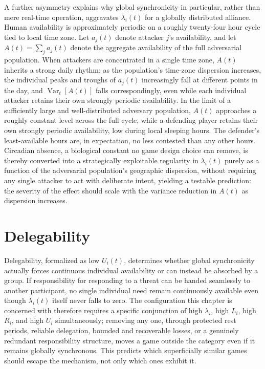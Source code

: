 A further asymmetry explains why global synchronicity in particular, rather than mere real-time operation, aggravates $\lambda_i(t)$ for a globally distributed alliance. Human availability is approximately periodic on a roughly twenty-four hour cycle tied to local time zone. Let $a_j(t)$ denote attacker $j$'s availability, and let $A(t) = \sum_j a_j(t)$ denote the aggregate availability of the full adversarial population. When attackers are concentrated in a single time zone, $A(t)$ inherits a strong daily rhythm; as the population's time-zone dispersion increases, the individual peaks and troughs of $a_j(t)$ increasingly fall at different points in the day, and $\operatorname{Var}_t[A(t)]$ falls correspondingly, even while each individual attacker retains their own strongly periodic availability. In the limit of a sufficiently large and well-distributed adversary population, $A(t)$ approaches a roughly constant level across the full cycle, while a defending player retains their own strongly periodic availability, low during local sleeping hours. The defender's least-available hours are, in expectation, no less contested than any other hours. Circadian absence, a biological constant no game design choice can remove, is thereby converted into a strategically exploitable regularity in $\lambda_i(t)$ purely as a function of the adversarial population's geographic dispersion, without requiring any single attacker to act with deliberate intent, yielding a testable prediction: the severity of the effect should scale with the variance reduction in $A(t)$ as dispersion increases.

\section{Delegability}

Delegability, formalized as low $U_i(t)$, determines whether global synchronicity actually forces continuous individual availability or can instead be absorbed by a group. If responsibility for responding to a threat can be handed seamlessly to another participant, no single individual need remain continuously available even though $\lambda_i(t)$ itself never falls to zero. The configuration this chapter is concerned with therefore requires a specific conjunction of high $\lambda_i$, high $L_i$, high $R_i$, and high $U_i$ simultaneously; removing any one, through protected rest periods, reliable delegation, bounded and recoverable losses, or a genuinely redundant responsibility structure, moves a game outside the category even if it remains globally synchronous. This predicts which superficially similar games should escape the mechanism, not only which ones exhibit it.

